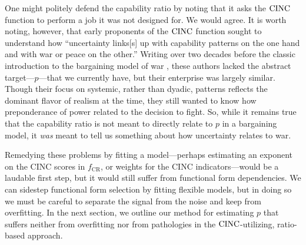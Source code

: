 One might politely defend the capability ratio by noting that it asks the $\operatorname{CINC}$ function to perform a job it was not designed for.
We would agree.
It is worth noting, however, that early proponents of the $\operatorname{CINC}$ function \citep[24]{singer1972} sought to understand how ``uncertainty links[s] up with capability patterns on the one hand and with war or peace on the other.''
Writing over two decades before the classic introduction to the bargaining model of war \citep{fearon1995}, these authors lacked the abstract target---$p$---that we currently have, but their enterprise was largely similar.
Though their focus on systemic, rather than dyadic, patterns reflects the dominant flavor of realism at the time, they still wanted to know how preponderance of power related to the decision to fight.
So, while it remains true that the capability ratio is not meant to directly relate to $p$ in a bargaining model, it \emph{was} meant to tell us something about how uncertainty relates to war.

Remedying these problems by fitting a model---perhaps estimating an exponent on the CINC scores in $f_{\text{CR}}$, or weights for the CINC indicators---would be a laudable first step, but it would still suffer from functional form dependencies.
We can sidestep functional form selection by fitting flexible models, but in doing so we must be careful to separate the signal from the noise and keep from overfitting.
In the next section, we outline our method for estimating $p$ that suffers neither from overfitting nor from pathologies in the $\operatorname{CINC}$-utilizing, ratio-based approach.

